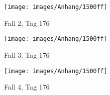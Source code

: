 \vspace{-2cm}

\begin{figure}[h]
\begin{center}
\texttt{[image: images/Anhang/1500ff]}
\end{center}
\vspace{-25pt}
\caption{Fall 2, Tag 176}
\label{fig:fall2}
\end{figure}

\vspace{-2cm}

\begin{figure}[h]
\begin{center}
\texttt{[image: images/Anhang/1500ff]}
\end{center}
\vspace{-25pt}
\caption{Fall 3, Tag 176}
\label{fig:fall3}
\end{figure}

\vspace{-2cm}

\begin{figure}[h]
\begin{center}
\texttt{[image: images/Anhang/1500ff]}
\end{center}
\vspace{-25pt}
\caption{Fall 4, Tag 176}
\label{fig:fall4}
\end{figure}
